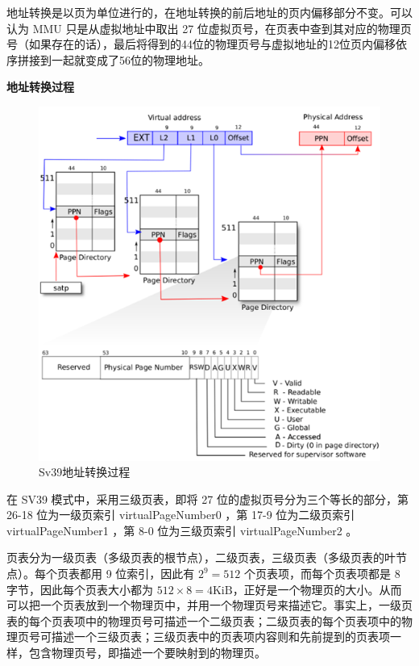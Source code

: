 地址转换是以页为单位进行的，在地址转换的前后地址的页内偏移部分不变。可以认为 MMU 只是从虚拟地址中取出 27 位虚拟页号，在页表中查到其对应的物理页号（如果存在的话），最后将得到的44位的物理页号与虚拟地址的12位页内偏移依序拼接到一起就变成了56位的物理地址。


\textbf{地址转换过程}

\begin{figure}[htb]
    \figureCapSet
    \centering
    \includegraphics[width=.8\linewidth]{figure/c2/addressv2p.png}
    \caption{Sv39地址转换过程}
    \label{figure:c2addressv2p}
\end{figure}

在 SV39 模式中，采用三级页表，即将 27 位的虚拟页号分为三个等长的部分，第 26-18 位为一级页索引 virtualPageNumber0 ，第 17-9 位为二级页索引 virtualPageNumber1 ，第 8-0 位为三级页索引 virtualPageNumber2 。

页表分为一级页表（多级页表的根节点），二级页表，三级页表（多级页表的叶节点）。每个页表都用 9 位索引，因此有 $2^9=512$ 个页表项，而每个页表项都是 8 字节，因此每个页表大小都为 $512\times 8=4 \mathrm{KiB}$，正好是一个物理页的大小。从而可以把一个页表放到一个物理页中，并用一个物理页号来描述它。事实上，一级页表的每个页表项中的物理页号可描述一个二级页表；二级页表的每个页表项中的物理页号可描述一个三级页表；三级页表中的页表项内容则和先前提到的页表项一样，包含物理页号，即描述一个要映射到的物理页。


